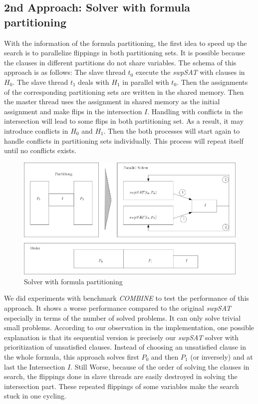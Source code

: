 \documentclass[12pt,a4paper,twoside]{scrartcl}
\numberwithin{equation}{section}
\begin{document}
\subsection{2nd Approach: Solver with formula partitioning}
\label{sec:2nd}
With the information of the formula partitioning, the first idea to speed up the search is to parallelize flippings in both partitioning sets. It is possible because the clauses in different partitions do not share variables. The schema of this approach is as follows: The slave thread $t_0$ execute the \emph{swpSAT} with clauses in $H_0$. The slave thread $t_1$ deals with $H_1$ in parallel with $t_0$. Then the assignments of the corresponding partitioning sets are written in the shared memory. Then the master thread uses the assignment in shared memory as the initial assignment and make flips in the intersection $I$.  Handling with conflicts in the intersection will lead to some flips in both partitioning set. As a result, it may introduce conflicts in $H_0$ and $H_1$. Then the both processes will start again to handle conflicts in partitioning sets individually. This process will repeat itself until no conflicts exists.
\begin{figure}[H]
\begin{center}
  \includegraphics[scale = 0.5]{1/a2.png}
  \end{center}
  \label{a2}
    \caption{Solver with formula partitioning}
  \end{figure}
We did experiments with benchmark \emph{COMBINE} to test the performance of this approach. It shows a worse performance compared to the original \emph{swpSAT} especially in terms of the number of solved problems. It can only solve trivial small problems. According to our observation in the implementation, one possible explanation is that its sequential version is precisely our \emph{swpSAT} solver with prioritization of unsatisfied clauses. Instead of choosing an unsatisfied clause in the whole formula, this approach solves first $P_0$ and then $P_1$ (or inversely) and at last the Intersection $I$. Still Worse, because of the order of solving the clauses in search, the flippings done in slave threads are easily destroyed in solving the intersection part. These repeated flippings of some variables make the search stuck in one cycling.
\end{document}
